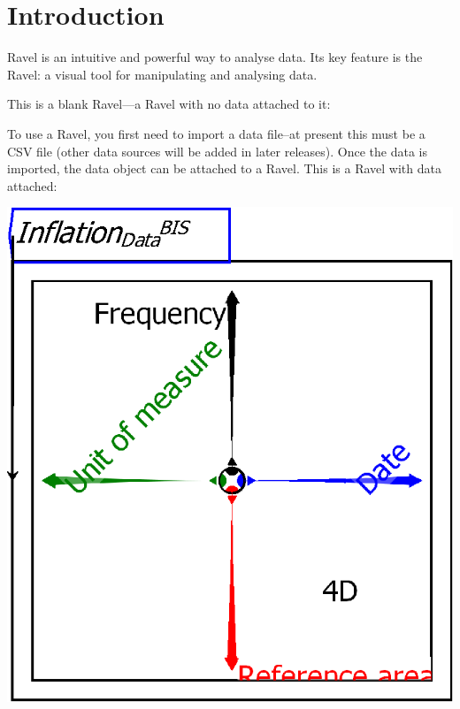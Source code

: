 \chapter{Introduction}
\label{Introduction}
Ravel is an intuitive and powerful way to analyse data. Its key feature is the Ravel: a visual tool for manipulating and analysing data.

This is a blank Ravel---a Ravel with no data attached to it:

\begin{center}
\end{center}

To use a Ravel, you first need to import a data file--at present this must be a CSV file (other data sources will be added in later releases). Once the data is imported, the data object can be attached to a Ravel. This is a Ravel with data attached:

\begin{center}
\includegraphics{images/01RavelDataInflation.eps}
\end{center}

